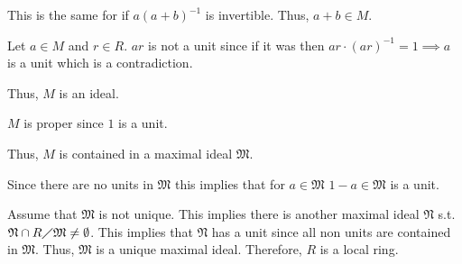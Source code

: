 \documentclass[12pt, letterpaper]{article}
\newcommand{\mf}[1]{\mathfrak{#1}}
\begin{document}
\begin{problemproof}
    This is the same for if $a(a+b)^{-1}$ is invertible. Thus, $a+b \in M$.

    Let $a \in M$ and $r \in R$. $ar$ is not a unit since if it was then $ar \cdot (ar)^{-1}=1 \implies a$ is a unit which is a contradiction.

    Thus, $M$ is an ideal.

    $M$ is proper since $1$ is a unit.

    Thus, $M$ is contained in a maximal ideal $\mf{M}$.

    Since there are no units in $\mf{M}$ this implies that for $a \in \mf{M}$ $1-a \in \mf{M}$ is a unit.

    Assume that $\mf{M}$ is not unique. This implies there is another maximal ideal $\mf{N}$ s.t. $\mf{N} \cap R \diagup \mf{M} \neq \emptyset$. This implies that $\mf{N}$ has a unit since all non units are contained in $\mf{M}$. Thus, $\mf{M}$ is a unique maximal ideal.
    Therefore, $R$ is a local ring. 
\end{problemproof}
\end{document}
